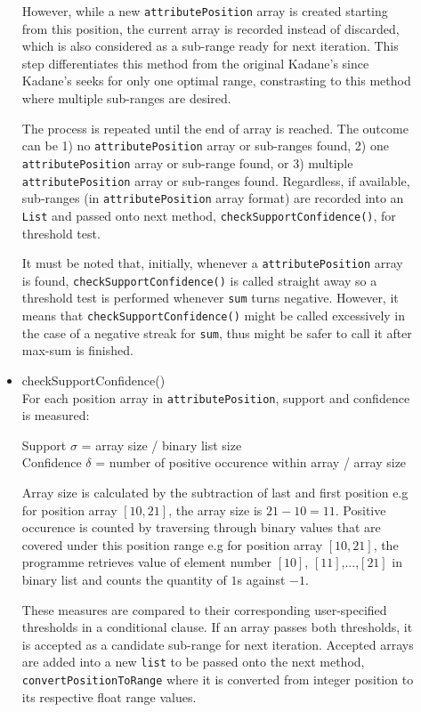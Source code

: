 \begin{description}
\begin{itemize}
	However, while a new \texttt{attributePosition} array is created starting from this position, the current array is recorded instead of discarded, which is also considered as a sub-range ready for next iteration. This step differentiates this method from the original Kadane's since Kadane's seeks for only one optimal range, constrasting to this method where multiple sub-ranges are desired.
	
	The process is repeated until the end of array is reached. The outcome can be 1) no \texttt{attributePosition} array or sub-ranges found, 2) one \texttt{attributePosition} array or sub-range found, or 3) multiple \texttt{attributePosition} array or sub-ranges found. Regardless, if available, sub-ranges (in \texttt{attributePosition} array format) are recorded into an \texttt{List} and passed onto next method, \texttt{checkSupportConfidence()}, for threshold test. 
	
	It must be noted that, initially, whenever a \texttt{attributePosition} array is found, \texttt{checkSupportConfidence()} is called straight away so a threshold test is performed whenever \texttt{sum} turns negative. However, it means that \texttt{checkSupportConfidence()} might be called excessively in the case of a negative streak for \texttt{sum}, thus might be safer to call it after max-sum is finished. 
	
	\item{checkSupportConfidence()} \\
	 For each position array in \texttt{attributePosition}, support and confidence is measured:
	  
	 Support $\sigma$ = array size / binary list size \\
	 Confidence $\delta$ = number of positive occurence within array / array size
	 
	 Array size is calculated by the subtraction of last and first position e.g for position array $[10,21]$, the array size is $21 - 10 = 11$. Positive occurence is counted by traversing through binary values that are covered under this position range e.g for position array $[10,21]$, the programme retrieves value of element number $[10]$, $[11]$,...,$[21]$ in binary list and counts the quantity of $1$s against $-1$. 
	 
	 These measures are compared to their corresponding user-specified thresholds in a conditional clause. If an array passes both thresholds, it is accepted as a candidate sub-range for next iteration. Accepted arrays are added into a new \texttt{list} to be passed onto the next method, \texttt{convertPositionToRange} where it is converted from integer position to its respective float range values.
	 

\end{itemize}
\end{description}
